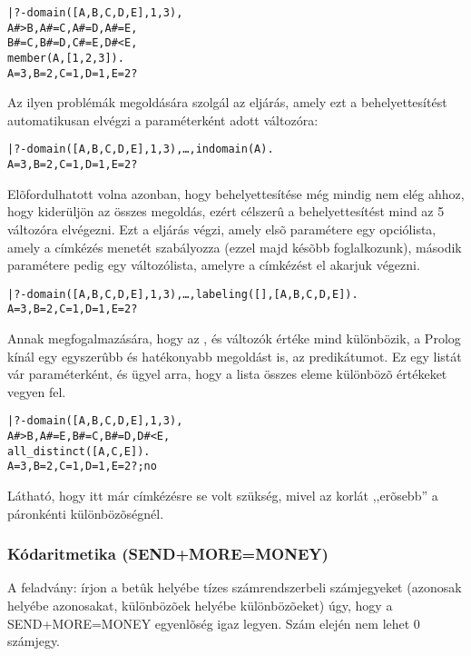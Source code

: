 \begin{alltt}
| ?- domain([A,B,C,D,E], 1, 3), 
     A #> B, A #\bs= C, A #\bs= D, A #\bs= E,
     B #\bs= C, B #\bs= D, C #\bs= E, D #< E,
     member(A, [1,2,3]).
A = 3, B = 2, C = 1, D = 1, E = 2 ?
\end{alltt}

Az ilyen problémák megoldására szolgál az  eljárás, amely
ezt a behelyettesítést automatikusan elvégzi a paraméterként adott változóra:

\begin{alltt}
| ?- domain([A,B,C,D,E], 1, 3), \ldots, indomain(A).
A = 3, B = 2, C = 1, D = 1, E = 2 ?
\end{alltt}

Elõfordulhatott volna azonban, hogy  behelyettesítése még mindig
nem elég ahhoz, hogy kiderüljön az összes megoldás, ezért célszerû
a behelyettesítést mind az 5 változóra elvégezni. Ezt a 
eljárás végzi, amely elsõ paramétere egy opciólista, amely a címkézés
menetét szabályozza (ezzel majd késõbb foglalkozunk), második paramétere
pedig egy változólista, amelyre a címkézést el akarjuk végezni.

\begin{alltt}
| ?- domain([A,B,C,D,E], 1, 3), \ldots, labeling([],[A,B,C,D,E]).
A = 3, B = 2, C = 1, D = 1, E = 2 ?
\end{alltt}

Annak megfogalmazására, hogy az ,  és  változók értéke
mind különbözik, a Prolog kínál egy egyszerûbb és hatékonyabb megoldást is,
az  predikátumot. Ez egy listát vár paraméterként, és
ügyel arra, hogy a lista összes eleme különbözõ értékeket vegyen fel.

\begin{alltt}
| ?- domain([A,B,C,D,E], 1, 3),
     A #> B, A #\bs= E, B #\bs= C, B #\bs= D, D #< E,
     all_distinct([A,C,E]). 
A = 3, B = 2, C = 1, D = 1, E = 2 ? ; no
\end{alltt}

Látható, hogy itt már címkézésre se volt szükség, mivel az 
korlát ,,erõsebb'' a páronkénti különbözõségnél.

\subsubsection{Kódaritmetika (SEND+MORE=MONEY)}

\label{sendmoremoney}

A feladvány: írjon a betûk helyébe tízes számrendszerbeli számjegyeket
(azonosak helyébe azonosakat, különbözõek helyébe különbözõeket) úgy, hogy a
SEND+MORE=MONEY egyenlõség igaz legyen. Szám elején nem lehet 0 számjegy.

